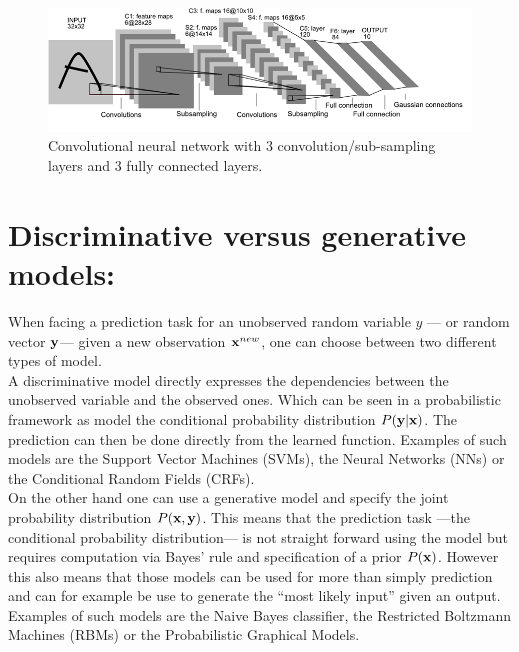 \documentclass[a4paper,11pt]{report}
\begin{document}
			\begin{figure}[h]
				\begin{center}
					\includegraphics[width=5in]{CNN.png}
					\caption[Convolutional neural network.]{\centering  Convolutional neural network with $3$ convolution/sub-sampling layers and $3$ fully connected layers. }
					\label{fig:SNN}
				\end{center}	
      \end{figure}
			
			         
	\section{Discriminative versus generative models:}
		\label{sec:Intro/Discr vs gen}
		
		When facing a prediction task for an unobserved random variable $y$ --- or random vector ${\bf y}$--- given a new observation ${\bf x}^{new}$, one can choose between two different types of model.\\
		
		A discriminative model directly expresses the dependencies between the unobserved variable and the observed ones. Which can be seen in a probabilistic framework as model the conditional probability distribution $P({\bf y}|{\bf x})$. The prediction can then be done directly from the learned function. Examples of such models are the Support Vector Machines (SVMs), the Neural Networks (NNs) or the Conditional Random Fields (CRFs).\\
		
		On the other hand one can use a generative model and specify the joint probability distribution $P({\bf x},{\bf y})$. This means that the prediction task ---\ie the conditional probability distribution--- is not straight forward using the model but requires computation via Bayes' rule and specification of a prior $P({\bf x})$. However this also means that those models can be used for more than simply prediction and can for example be use to generate the ``most likely input'' given an output. Examples of such models are the Naive Bayes classifier, the Restricted Boltzmann Machines (RBMs) or the Probabilistic Graphical Models.\\
		
\end{document}
